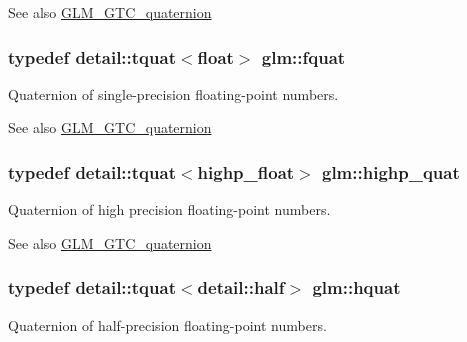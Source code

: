 \begin{DoxySeeAlso}{See also}
\hyperlink{group__gtc__quaternion}{G\+L\+M\+\_\+\+G\+T\+C\+\_\+quaternion} 
\end{DoxySeeAlso}
\hypertarget{group__gtc__quaternion_ga026fc67b7357f270b8226f9bcd1ac2c1}{}
\subsubsection[{fquat}]{\setlength{\rightskip}{0pt plus 5cm}typedef detail\+::tquat$<$float$>$ {\bf glm\+::fquat}}\label{group__gtc__quaternion_ga026fc67b7357f270b8226f9bcd1ac2c1}
Quaternion of single-\/precision floating-\/point numbers.

\begin{DoxySeeAlso}{See also}
\hyperlink{group__gtc__quaternion}{G\+L\+M\+\_\+\+G\+T\+C\+\_\+quaternion} 
\end{DoxySeeAlso}
\hypertarget{group__gtc__quaternion_ga86a81668075e0896b7d6cd395d1d01ec}{}
\subsubsection[{highp\+\_\+quat}]{\setlength{\rightskip}{0pt plus 5cm}typedef detail\+::tquat$<$highp\+\_\+float$>$ {\bf glm\+::highp\+\_\+quat}}\label{group__gtc__quaternion_ga86a81668075e0896b7d6cd395d1d01ec}
Quaternion of high precision floating-\/point numbers.

\begin{DoxySeeAlso}{See also}
\hyperlink{group__gtc__quaternion}{G\+L\+M\+\_\+\+G\+T\+C\+\_\+quaternion} 
\end{DoxySeeAlso}
\hypertarget{group__gtc__quaternion_ga9601a7ab2375426d8f302f0be9507586}{}
\subsubsection[{hquat}]{\setlength{\rightskip}{0pt plus 5cm}typedef detail\+::tquat$<$detail\+::half$>$ {\bf glm\+::hquat}}\label{group__gtc__quaternion_ga9601a7ab2375426d8f302f0be9507586}
Quaternion of half-\/precision floating-\/point numbers.

